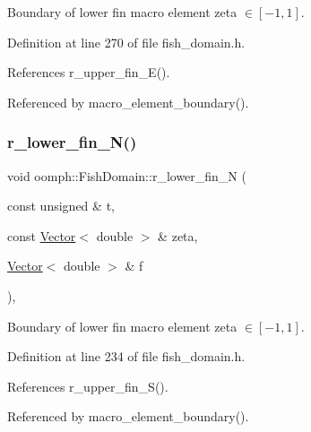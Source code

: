 Boundary of lower fin macro element zeta $ \in [-1,1] $. 



Definition at line 270 of file fish\+\_\+domain.\+h.



References r\+\_\+upper\+\_\+fin\+\_\+\+E().



Referenced by macro\+\_\+element\+\_\+boundary().

\mbox{\label{classoomph_1_1FishDomain_a6d45dba13043b2b6df831848da665f21}} 
\subsubsection{\texorpdfstring{r\+\_\+lower\+\_\+fin\+\_\+\+N()}{r\_lower\_fin\_N()}}
{\footnotesize\ttfamily void oomph\+::\+Fish\+Domain\+::r\+\_\+lower\+\_\+fin\+\_\+N (\begin{DoxyParamCaption}\item[{const unsigned \&}]{t,  }\item[{const \hyperlink{classoomph_1_1Vector}{Vector}$<$ double $>$ \&}]{zeta,  }\item[{\hyperlink{classoomph_1_1Vector}{Vector}$<$ double $>$ \&}]{f }\end{DoxyParamCaption})\hspace{0.3cm}{\ttfamily [inline]}, {\ttfamily [private]}}



Boundary of lower fin macro element zeta $ \in [-1,1] $. 



Definition at line 234 of file fish\+\_\+domain.\+h.



References r\+\_\+upper\+\_\+fin\+\_\+\+S().



Referenced by macro\+\_\+element\+\_\+boundary().

\mbox{\label{classoomph_1_1FishDomain_a2110fb0b776654460d6a3477fbc4979d}} 

